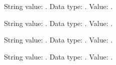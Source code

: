 \documentclass[12pt]{article}
\begin{document}

\DTLparse{}
String value: \result.
Data type: \DTLdatumtype{\result}.
Value: \DTLdatumvalue{\result}. 

\DTLparse{}
String value: \result.
Data type: \DTLdatumtype{\result}.
Value: \DTLdatumvalue{\result}. 

\DTLparse{}
String value: \result.
Data type: \DTLdatumtype{\result}.
Value: \DTLdatumvalue{\result}. 

\DTLparse{}
String value: \result.
Data type: \DTLdatumtype{\result}.
Value: \DTLdatumvalue{\result}. 
\end{document}
